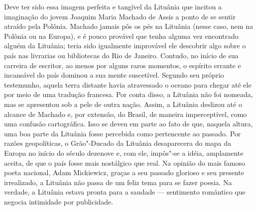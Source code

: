 {Deve ter sido essa imagem perfeita e tangível da Lituânia que incitou a
imaginação do jovem Joaquim Maria Machado de Assis a ponto de se sentir
atraído pela Polônia. Machado jamais pôs os pés na Lituânia (nesse caso,
nem na Polônia ou na Europa), e é pouco provável que tenha alguma vez
encontrado alguém da Lituânia; teria sido igualmente improvável ele
descobrir algo sobre o país nas livrarias ou bibliotecas do Rio de
Janeiro. Contudo, no início de sua carreira de escritor, ao menos por
alguns raros momentos, o espírito errante e incansável do país dominou a
sua mente suscetível. Segundo seu próprio testemunho, aquela terra
distante havia atravessado o oceano para chegar até ele por meio de uma
tradução francesa. Por conta disso, a Lituânia não foi nomeada, mas se
apresentou sob a pele de outra nação. Assim, a Lituânia deslizou até o
alcance de Machado e, por extensão, do Brasil, de maneira imperceptível,
como uma confusão cartográfica. Isso se deveu em parte ao fato de que,
naquela altura, uma boa parte da Lituânia fosse percebida como
pertencente ao passado. Por razões geopolíticas, o Grão"-Ducado da
Lituânia desaparecera do mapa da Europa no início do século dezenove e,
com ele, impôs"-se a idéia, amplamente aceita, de que o país fosse mais
nostálgico que real. Na opinião do mais famoso poeta nacional, Adam
Mickiewicz, graças a seu passado glorioso e seu presente irrealizado, a
Lituânia não passa de um feliz tema para se fazer poesia. Na verdade, a
Lituânia estava pronta para a saudade --- sentimento romântico que negocia
intimidade por publicidade.

}
